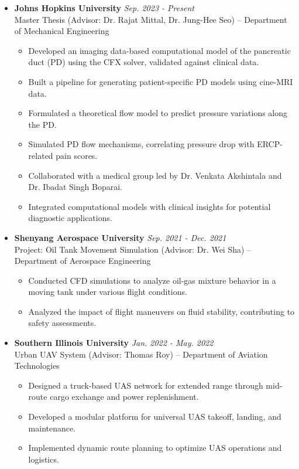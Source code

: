 \documentclass[11pt]{article}
\begin{document}
\begin{itemize}[leftmargin=*,itemsep=1pt]

    \item \textbf{Johns Hopkins University} \hfill \textit{Sep. 2023 - Present} \\
    Master Thesis (Advisor: Dr. Rajat Mittal, Dr. Jung-Hee Seo) – Department of Mechanical Engineering
    \begin{itemize}[leftmargin=*,itemsep=1pt]
        \item Developed an imaging data-based computational model of the pancreatic duct (PD) using the CFX solver, validated against clinical data.
        \item Built a pipeline for generating patient-specific PD models using cine-MRI data.
        \item Formulated a theoretical flow model to predict pressure variations along the PD.
        \item Simulated PD flow mechanisms, correlating pressure drop with ERCP-related pain scores.
        \item Collaborated with a medical group led by Dr. Venkata Akshintala and Dr. Ibadat Singh Boparai.
        \item Integrated computational models with clinical insights for potential diagnostic applications.
    \end{itemize}

    \item \textbf{Shenyang Aerospace University} \hfill \textit{Sep. 2021 - Dec. 2021} \\
    Project: Oil Tank Movement Simulation (Advisor: Dr. Wei Sha) – Department of Aerospace Engineering
    \begin{itemize}[leftmargin=*,itemsep=1pt]
        \item Conducted CFD simulations to analyze oil-gas mixture behavior in a moving tank under various flight conditions.
        \item Analyzed the impact of flight maneuvers on fluid stability, contributing to safety assessments.
    \end{itemize}

    \item \textbf{Southern Illinois University} \hfill \textit{Jan. 2022 - May. 2022} \\
    Urban UAV System (Advisor: Thomas Roy) – Department of Aviation Technologies
    \begin{itemize}[leftmargin=*,itemsep=1pt]
        \item Designed a truck-based UAS network for extended range through mid-route cargo exchange and power replenishment.
        \item Developed a modular platform for universal UAS takeoff, landing, and maintenance.
        \item Implemented dynamic route planning to optimize UAS operations and logistics.
    \end{itemize}

\end{itemize}
\end{document}
